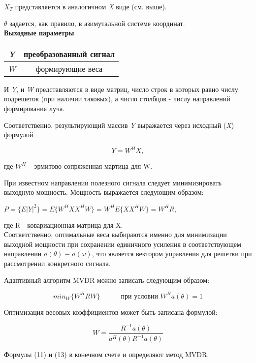 \documentclass{article}
\begin{document}
$X_T$ представляется в аналогичном \textit{X} виде (см. выше).

$\theta$ задается, как правило, в азимутальной системе координат.\\


\textbf{Выходные параметры}

\begin{tabular}{c|c}
\hline
\textit{Y} & преобразованный сигнал \\
\hline
\textit{W} & формирующие веса \\
\hline



\end{tabular}


И \textit{Y}, и \textit{W} представляются в виде матриц, число строк в которых равно числу подрешеток (при наличии таковых), а число столбцов - числу направлений формирования луча.


Соответственно, результирующий массив \textit{Y} выражается через исходный (\textit{X}) формулой 

\begin{equation}
Y = W^H X,
\end{equation}

где $W^H$ -- эрмитово-сопряженная мартица для W.

При известном направлении полезного сигнала следует минимизировать выходную мощность. Мощность выражается следующим образом:

\begin{center}
$P = \{E|Y|^2\} = E\{W^H X X^H W\} = W^H E\{X X^H W\} = W^H R,$
\end{center}

где R - ковариационная матрица для X.\\ 

Соответственно, оптимальные веса выбираются именно для минимизации выходной мощности при сохранении единичного усиления в соответствующем направлении $a(\theta) \equiv a(\omega)$, что является вектором управления для решетки при рассмотрении конкретного сигнала.

Адаптивный алгоритм MVDR можно записать следующим образом:

\begin{equation}
min_W \{W^H R W\} \text{  }\text{  } \text{  }\text{  }\text{          при условии } W^H a(\theta) = 1
\end{equation}

Оптимизация весовых коэффициентов может быть записана  формулой:

\begin{equation}
W=\frac{R^{-1}a(\theta)}{a^H(\theta)R^{-1}a(\theta)}
\end{equation}

Формулы (11) и (13) в конечном счете и определяют метод MVDR.

\printbibliography
\end{document}

